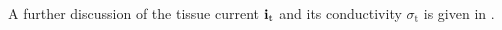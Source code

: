 A further discussion of the tissue current ${\bf i}_\text{t}$ and its conductivity $\sigma_\text{t}$
is given in .

%

%




